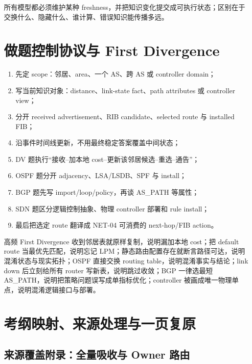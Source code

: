 \documentclass[11pt,a4paper]{ctexart}
\begin{document}
所有模型都必须维护某种 freshness，并把知识变化提交成可执行状态；区别在于交换什么、隐藏什么、谁计算、错误知识能传播多远。

\section{做题控制协议与 First Divergence}

\begin{enumerate}
  \item 先定 scope：邻居、area、一个 AS、跨 AS 或 controller domain；
  \item 写当前知识对象：distance、link-state fact、path attributes 或 controller view；
  \item 分开 received advertisement、RIB candidate、selected route 与 installed FIB；
  \item 沿事件时间线更新，不用最终稳定答案覆盖中间状态；
  \item DV 题执行“接收--加本地 cost--更新该邻居候选--重选--通告”；
  \item OSPF 题分开 adjacency、LSA/LSDB、SPF 与 install；
  \item BGP 题先写 import/loop/policy，再谈 AS\_PATH 等属性；
  \item SDN 题区分逻辑控制抽象、物理 controller 部署和 rule install；
  \item 最后把选定 route 翻译成 NET-04 可消费的 next-hop/FIB action。
\end{enumerate}

\begin{warnbox}{高频 First Divergence}
收到邻居表就原样复制，说明漏加本地 cost；把 default route 当最优先匹配，说明忘记 LPM；静态路由配置存在就断言路径可达，说明混淆状态与现实拓扑；OSPF 直接交换 routing table，说明混淆事实与结论；link down 后立刻给所有 router 写新表，说明跳过收敛；BGP 一律选最短 AS\_PATH，说明把策略问题误写成单指标优化；controller 被画成唯一物理单点，说明混淆逻辑接口与部署。
\end{warnbox}

\section{考纲映射、来源处理与一页复原}

\subsection{来源覆盖附录：全量吸收与 Owner 路由}
\end{document}
